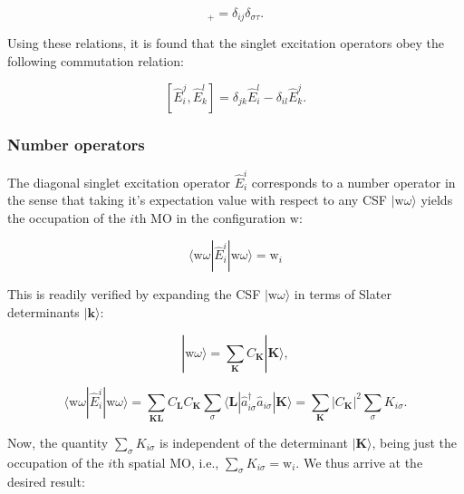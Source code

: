 \documentclass[12pt,a4paper]{report}
\begin{document}
\begin{equation}
  [ \hat{a}_{i\sigma}^{\dagger}, \hat{a}_{j\tau} ]_{+} = \delta_{ij}
  \delta_{\sigma\tau}.
\end{equation}

\noindent
Using these relations, it is found that the singlet excitation
operators obey the following commutation relation:

\begin{equation}\label{eq:generator_commutation}
  [\hat{E}_{i}^{j}, \hat{E}_{k}^{l}] = \delta_{jk} \hat{E}_{i}^{l} -
  \delta_{il} \hat{E}_{k}^{j}.
\end{equation}

\subsubsection{Number operators}
The diagonal singlet excitation operator $\hat{E}_{i}^{i}$ corresponds
to a number operator in the sense that taking it's expectation value
with respect to any CSF $| \text{w} \omega \rangle$ yields the
occupation of the $i$th MO in the configuration $\text{w}$:

\begin{equation}\label{eq:number_operator}
  \langle \text{w} \omega | \hat{E}_{i}^{i} | \text{w} \omega \rangle
  = \text{w}_{i}
\end{equation}

This is readily verified by expanding the CSF $| \text{w} \omega
\rangle$ in terms of Slater determinants $| \boldsymbol{k} \rangle$:

\begin{equation}
  | \text{w} \omega \rangle = \sum_{\boldsymbol{K}} C_{\boldsymbol{K}}
  | \boldsymbol{K} \rangle,
\end{equation}

\begin{equation}
    \langle \text{w} \omega | \hat{E}_{i}^{i} | \text{w} \omega
    \rangle = \sum_{\boldsymbol{KL}} C_{\boldsymbol{L}}
    C_{\boldsymbol{K}} \sum_{\sigma} \langle \boldsymbol{L}
    |\hat{a}_{i\sigma}^{\dagger} \hat{a}_{i\sigma} | \boldsymbol{K}
    \rangle = \sum_{\boldsymbol{K}} |C_{\boldsymbol{K}}|^{2}
    \sum_{\sigma} K_{i\sigma}.
\end{equation}

\noindent
Now, the quantity $\sum_{\sigma} K_{i\sigma}$ is independent of the
determinant $| \boldsymbol{K} \rangle$, being just the occupation of
the $i$th spatial MO, i.e., $\sum_{\sigma} K_{i\sigma} =
\text{w}_{i}$. We thus arrive at the desired result:
\end{document}
